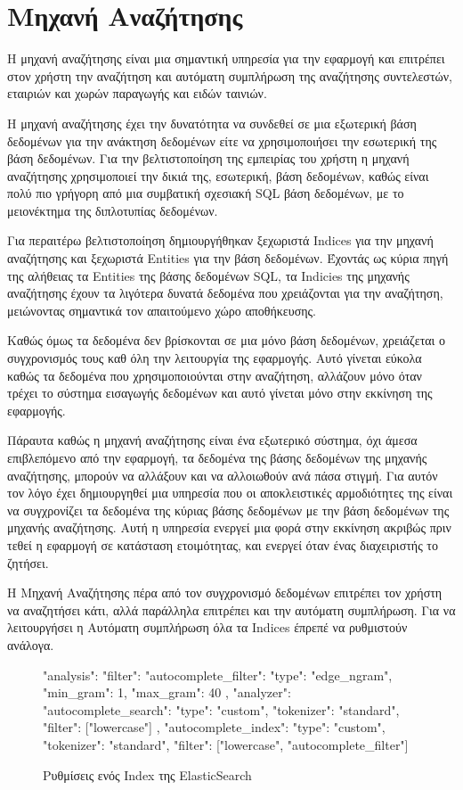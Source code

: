 \section{Μηχανή Αναζήτησης}
Η μηχανή αναζήτησης είναι μια σημαντική υπηρεσία για την εφαρμογή και επιτρέπει στον χρήστη την αναζήτηση και αυτόματη συμπλήρωση της αναζήτησης συντελεστών, εταιριών και χωρών παραγωγής και ειδών ταινιών. 

Η μηχανή αναζήτησης έχει την δυνατότητα να συνδεθεί σε μια εξωτερική βάση δεδομένων για την ανάκτηση δεδομένων είτε να χρησιμοποιήσει την εσωτερική της βάση δεδομένων. Για την βελτιστοποίηση της εμπειρίας του χρήστη η μηχανή αναζήτησης χρησιμοποιεί την δικιά της, εσωτερική, βάση δεδομένων, καθώς είναι πολύ πιο γρήγορη από μια συμβατική σχεσιακή SQL βάση δεδομένων, με το μειονέκτημα της διπλοτυπίας δεδομένων. 

Για περαιτέρω βελτιστοποίηση δημιουργήθηκαν ξεχωριστά Indices για την μηχανή αναζήτησης και ξεχωριστά Entities για την βάση δεδομένων. Έχοντάς ως κύρια πηγή της αλήθειας τα Entities της βάσης δεδομένων SQL, τα Indicies της μηχανής αναζήτησης έχουν τα λιγότερα δυνατά δεδομένα που χρειάζονται για την αναζήτηση, μειώνοντας σημαντικά τον απαιτούμενο χώρο αποθήκευσης.

Καθώς όμως τα δεδομένα δεν βρίσκονται σε μια μόνο βάση δεδομένων, χρειάζεται ο συγχρονισμός τους καθ όλη την λειτουργία της εφαρμογής. Αυτό γίνεται εύκολα καθώς τα δεδομένα που χρησιμοποιούνται στην αναζήτηση, αλλάζουν μόνο όταν τρέχει το σύστημα εισαγωγής δεδομένων και αυτό γίνεται μόνο στην εκκίνηση της εφαρμογής.

Πάραυτα καθώς η μηχανή αναζήτησης είναι ένα εξωτερικό σύστημα, όχι άμεσα επιβλεπόμενο από την εφαρμογή, τα δεδομένα της βάσης δεδομένων της μηχανής αναζήτησης, μπορούν να αλλάξουν και να αλλοιωθούν ανά πάσα στιγμή. Για αυτόν τον λόγο έχει δημιουργηθεί μια υπηρεσία που οι αποκλειστικές αρμοδιότητες της είναι να συγχρονίζει τα δεδομένα της κύριας βάσης δεδομένων με την βάση δεδομένων της μηχανής αναζήτησης. Αυτή η υπηρεσία ενεργεί μια φορά στην εκκίνηση ακριβώς πριν τεθεί η εφαρμογή σε κατάσταση ετοιμότητας, και ενεργεί όταν ένας διαχειριστής το ζητήσει. 

Η Μηχανή Αναζήτησης πέρα από τον συγχρονισμό δεδομένων επιτρέπει τον χρήστη να αναζητήσει κάτι, αλλά παράλληλα επιτρέπει και την αυτόματη συμπλήρωση. Για να λειτουργήσει η Αυτόματη συμπλήρωση όλα τα Indices έπρεπέ να ρυθμιστούν ανάλογα.

\begin{figure}[H]
    \begin{jsoncode}
{"analysis": {
  "filter": {
    "autocomplete_filter": {
      "type": "edge_ngram",
      "min_gram": 1,
      "max_gram": 40
    }
  },
  "analyzer": {
    "autocomplete_search": {
      "type": "custom",
      "tokenizer": "standard",
      "filter": ["lowercase"]
    },
    "autocomplete_index": {
      "type": "custom",
      "tokenizer": "standard",
      "filter": ["lowercase", "autocomplete_filter"]
    }
  }
}}
    \end{jsoncode}
    \caption{Ρυθμίσεις ενός Index της ElasticSearch}
   \label{config:es}
\end{figure}

